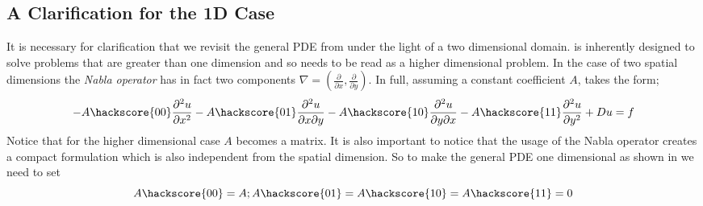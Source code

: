 \subsection{A Clarification for the 1D Case}
\label{SEC: 1D CLARIFICATION}
It is necessary for clarification that we revisit the general PDE from  under the light of a two dimensional domain. \esc is inherently designed to solve problems that are greater than one dimension and so  needs to be read as a higher dimensional problem. In the case of two spatial dimensions the \textit{Nabla operator} has in fact two components $\nabla = (\frac{\partial}{\partial x}, \frac{\partial}{\partial y})$. In full,  assuming a constant coefficient $A$, takes the form;
\begin{equation}\label{eqn:commonform2D}
-A\hackscore{00}\frac{\partial^{2}u}{\partial x^{2}} 
-A\hackscore{01}\frac{\partial^{2}u}{\partial x\partial y} 
-A\hackscore{10}\frac{\partial^{2}u}{\partial y\partial x} 
-A\hackscore{11}\frac{\partial^{2}u}{\partial y^{2}} 
+ Du = f
\end{equation}
Notice that for the higher dimensional case $A$ becomes a matrix. It is also
important to notice that the usage of the Nabla operator creates
a compact formulation which is also independent from the spatial dimension. 
So to make the general PDE  one dimensional as
shown in  we need to set
\begin{equation}
A\hackscore{00}=A; A\hackscore{01}=A\hackscore{10}=A\hackscore{11}=0
\end{equation}


